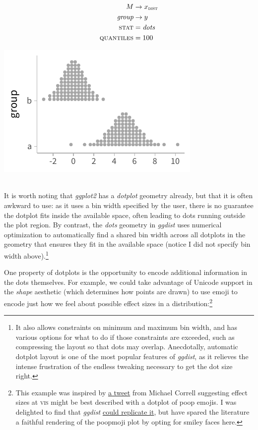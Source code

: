 \documentclass[journal]{vgtc}                     %
\newcommand{\equationfigure}[2]{%
\noindent
\begin{minipage}{.5\columnwidth}
\setlength{\abovedisplayskip}{0pt}
\setlength{\belowdisplayskip}{0pt}
#1\end{minipage}%
\begin{minipage}{.4\columnwidth}\centering #2 \end{minipage}%
\vspace{.5\belowdisplayskip}\\
}
\begin{document}
\equationfigure{
\begin{align*}
M &\rightarrow x_\textsc{dist}\\
\textit{group} &\rightarrow y\\
\textsc{stat} &= \mathit{dots}\\
\textsc{quantiles} &= 100
\end{align*}
}{\includegraphics[width=1.2\columnwidth]{figs/3-dots_two.pdf}}
It is worth noting that \textit{ggplot2} has a \textit{dotplot} geometry already, but that it is often awkward to use: as it uses a bin width specified by the user, there is no guarantee the dotplot fits inside the available space, often leading to dots running outside the plot region. By contrast, the \textit{dots} geometry in \textit{ggdist} uses numerical optimization to automatically find a shared bin width across all dotplots in the geometry that ensures they fit in the available space (notice I did not specify bin width above).\footnote{It also allows constraints on minimum and maximum bin width, and has various options for what to do if those constraints are exceeded, such as compressing the layout so that dots may overlap. Anecdotally, automatic dotplot layout is one of the most popular features of \textit{ggdist}, as it relieves the intense frustration of the endless tweaking necessary to get the dot size right.}

One property of dotplots is the opportunity to encode additional information in the dots themselves. For example, we could take advantage of Unicode support in the \textit{shape} aesthetic (which determines how points are drawn) to use emoji to encode just how we feel about possible effect sizes in a distribution:\footnote{This example was inspired by \href{https://twitter.com/Birdbassador/status/916332327696875520}{a tweet} from Michael Correll suggesting effect sizes at \textsc{vis} might be best described with a dotplot of poop emojis. I was delighted to find that \textit{ggdist} \href{https://twitter.com/mjskay/status/1361366253424832512}{could replicate it}, but have spared the literature a faithful rendering of the poopmoji plot by opting for smiley faces here.}
\end{document}
